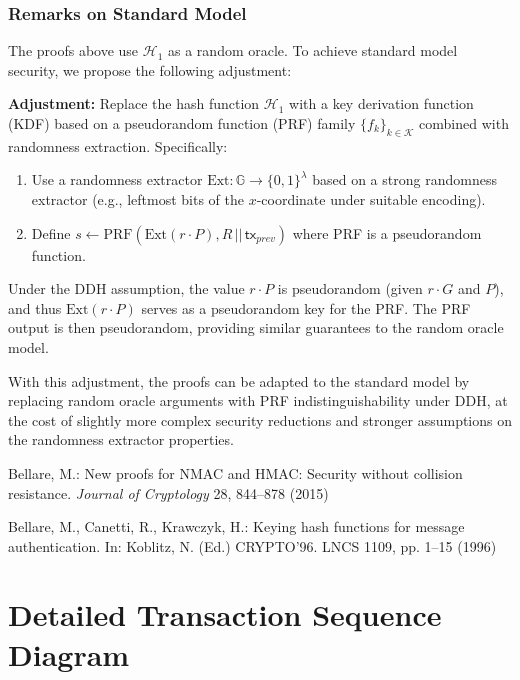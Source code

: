 \documentclass{article}
\begin{document}
\subsubsection{Remarks on Standard Model}

The proofs above use $\mathcal{H}_1$ as a random oracle. To achieve standard model security, we propose the following adjustment:

\textbf{Adjustment:} Replace the hash function $\mathcal{H}_1$ with a key derivation function (KDF) based on a pseudorandom function (PRF) family $\{f_k\}_{k \in \mathcal{K}}$ combined with randomness extraction. Specifically:
\begin{enumerate}
\item Use a randomness extractor $\text{Ext} \colon \mathbb{G} \to \{0,1\}^\lambda$ based on a strong randomness extractor (e.g., leftmost bits of the $x$-coordinate under suitable encoding).
\item Define $s \leftarrow \text{PRF}(\text{Ext}(r \cdot P), R \,||\, \mathsf{tx}_{prev})$ where PRF is a pseudorandom function.
\end{enumerate}

Under the DDH assumption, the value $r \cdot P$ is pseudorandom (given $r \cdot G$ and $P$), and thus $\text{Ext}(r \cdot P)$ serves as a pseudorandom key for the PRF. The PRF output is then pseudorandom, providing similar guarantees to the random oracle model.

With this adjustment, the proofs can be adapted to the standard model by replacing random oracle arguments with PRF indistinguishability under DDH, at the cost of slightly more complex security reductions and stronger assumptions on the randomness extractor properties.


\begin{thebibliography}{99}
 Bellare, M.: New proofs for NMAC and HMAC: Security without collision resistance.  \emph{Journal of Cryptology} 28, 844--878 (2015)

Bellare, M., Canetti, R., Krawczyk, H.: Keying hash functions for message authentication.
In: Koblitz, N. (Ed.) CRYPTO’96. LNCS 1109, pp. 1--15 (1996)
\end{thebibliography}

\pagebreak
\appendix
\section{Detailed Transaction Sequence Diagram}
\end{document}
